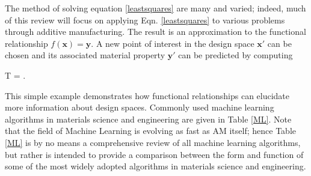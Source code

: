 


The method of solving equation \ref{leastsquares} are many and varied; indeed, much of this review will focus on applying Eqn. \ref{leastsquares} to various problems through additive manufacturing.
The result is an approximation to the functional relationship $f(\mathbf{x}) = \mathbf{y}$.
A new point of interest in the design space $\mathbf{x'}$ can be chosen and its associated material property $\mathbf{y'}$ can be predicted by computing

\eqn
{}T = .
\equ

This simple example demonstrates how functional relationships can elucidate more information about design spaces.
Commonly used machine learning algorithms in materials science and engineering are given in Table \ref{ML}.
Note that the field of Machine Learning is evolving as fast as AM itself; hence Table \ref{ML} is by no means a comprehensive review of all machine learning algorithms, but rather is intended to provide a comparison between the form and function of some of the most widely adopted algorithms in materials science and engineering.



